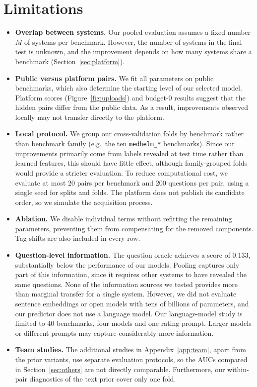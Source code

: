 \documentclass{article}
\newcommand{\code}[1]{\texttt{#1}}
\begin{document}
\section{Limitations}
\label{sec:limitations}

\begin{itemize}
  \item \textbf{Overlap between systems.} Our pooled evaluation assumes a fixed number $M$ of systems per benchmark. However, the number of systems in the final test is unknown, and the improvement depends on how many systems share a benchmark (Section~\ref{sec:platform}).
  \item \textbf{Public versus platform pairs.} We fit all parameters on public benchmarks, which also determine the starting level of our selected model. Platform scores (Figure~\ref{fig:uploads}) and budget-0 results suggest that the hidden pairs differ from the public data. As a result, improvements observed locally may not transfer directly to the platform.
  \item \textbf{Local protocol.} We group our cross-validation folds by benchmark rather than benchmark family (e.g.\ the ten \code{medhelm\_*} benchmarks). Since our improvements primarily come from labels revealed at test time rather than learned features, this should have little effect, although family-grouped folds would provide a stricter evaluation. To reduce computational cost, we evaluate at most 20 pairs per benchmark and 200 questions per pair, using a single seed for splits and folds. The platform does not publish its candidate order, so we simulate the acquisition process.
  \item \textbf{Ablation.} We disable individual terms without refitting the remaining parameters, preventing them from compensating for the removed components. Tag shifts are also included in every row.
  \item \textbf{Question-level information.} The question oracle achieves a score of 0.133, substantially below the performance of our models. Pooling captures only part of this information, since it requires other systems to have revealed the same questions. None of the information sources we tested provides more than marginal transfer for a single system. However, we did not evaluate sentence embeddings or open models with tens of billions of parameters, and our predictor does not use a language model. Our language-model study is limited to 40 benchmarks, four models and one rating prompt. Larger models or different prompts may capture considerably more information.
  \item \textbf{Team studies.} The additional studies in Appendix~\ref{app:team}, apart from the prior variants, use separate evaluation protocols, so the AUCs compared in Section~\ref{sec:others} are not directly comparable. Furthermore, our within-pair diagnostics of the text prior cover only one fold.
\end{itemize}
\end{document}
